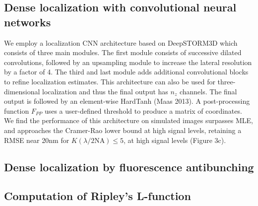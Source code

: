 \documentclass{ucetd}
\begin{document}
\subsection{Dense localization with convolutional neural networks}

We employ a localization CNN architecture based on DeepSTORM3D which consists of three main modules. The first module consists of successive dilated convolutions, followed by an upsampling module to increase the lateral resolution by a factor of 4. The third and last module adds additional convolutional blocks to refine localization estimates. This architecture can also be used for three-dimensional localization and thus the final output has $n_{z}$ channels. The final output is followed by an element-wise HardTanh (Maas 2013). A post-processing function $F_{PP}$ uses a user-defined threshold to produce a matrix of coordinates. We find the performance of this architecture on simulated images surpasses MLE, and approaches the Cramer-Rao lower bound at high signal levels, retaining a RMSE near 20nm for $K(\lambda/2\mathrm{NA}) \leq 5$, at high signal levels (Figure 3c). 

\subsection{Dense localization by fluorescence antibunching}

\subsection{Computation of Ripley's L-function}

\end{document}
